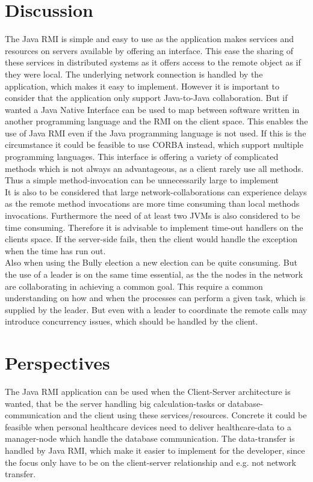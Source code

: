 \documentclass[Main]{subfiles}
\begin{document}
\section{Discussion}
The Java RMI is simple and easy to use as the application makes services and resources on servers available by offering an interface. This ease the sharing of these services in distributed systems as it offers access to the remote object as if they were local. The underlying network connection is handled by the application, which makes it easy to implement. However it is important to consider that the application only support Java-to-Java collaboration. But if wanted a Java Native Interface can be used to map between software written in another programming language and the RMI on the client space. This enables the use of Java RMI even if the Java programming language is not used. If this is the circumstance it could be feasible to use CORBA instead, which support multiple programming languages. This interface is offering a variety of complicated methods which is not always an advantageous, as a client rarely use all methods. Thus a simple method-invocation can be unnecessarily large to implement\\It is also to be considered that large network-collaborations can experience delays as the remote method invocations are more time consuming than local methods invocations. Furthermore the need of at least two JVMs is also considered to be time consuming. Therefore it is advisable to implement time-out handlers on the clients space. If the server-side fails, then the client would handle the exception when the time has run out.\\Also when using the Bully election a new election can be quite consuming. But the use of a leader is on the same time essential, as the the nodes in the network are collaborating in achieving a common goal. This require a common understanding on how and when the processes can perform a given task, which is supplied by the leader. But even with a leader to coordinate the remote calls may introduce concurrency issues, which should be handled by the client.

\section{Perspectives}
The Java RMI application can be used when the Client-Server architecture is wanted, that be the server handling big calculation-tasks or database-communication and the client using these services/resources. Concrete it could be feasible when personal healthcare devices need to deliver healthcare-data to a manager-node which handle the database communication. The data-transfer is handled by Java RMI, which make it easier to implement for the developer, since the focus only have to be on the client-server relationship and e.g. not network transfer. 
\end{document}
